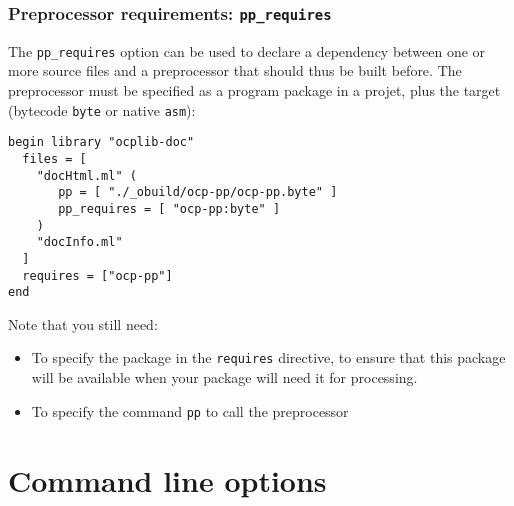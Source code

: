 \subsubsection{Preprocessor requirements: {\tt pp\_requires}}

The {\tt pp\_requires} option can be used to declare a dependency
between one or more source files and a preprocessor that should thus
be built before. The preprocessor must be specified as a program
package in a projet, plus the target (bytecode {\tt byte} or native
{\tt asm}):

\begin{verbatim}
begin library "ocplib-doc"
  files = [
    "docHtml.ml" (
       pp = [ "./_obuild/ocp-pp/ocp-pp.byte" ]
       pp_requires = [ "ocp-pp:byte" ]
    )
    "docInfo.ml"
  ]
  requires = ["ocp-pp"]
end
\end{verbatim}

Note that you still need:
\begin{itemize}
\item To specify the package in the {\tt requires} directive, to ensure that
  this package will be available when your package will need it for processing.
\item To specify the command {\tt pp} to call the preprocessor
\end{itemize}

\section{Command line options}
